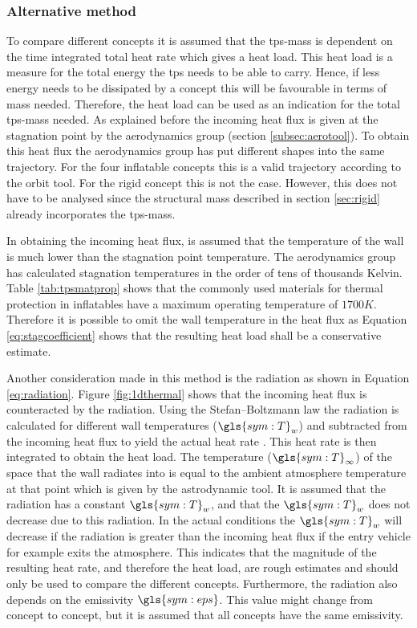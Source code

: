 \subsubsection{Alternative method}
To compare different concepts it is assumed that the \gls{tps}-mass is dependent on the time integrated total heat rate which gives a heat load. This heat load is a measure for the total energy the \gls{tps} needs to be able to carry. Hence, if less energy needs to be dissipated by a concept this will be favourable in terms of mass needed. Therefore, the heat load can be used as an indication for the total \gls{tps}-mass needed. As explained before the incoming heat flux is given at the stagnation point by the aerodynamics group (section \ref{subsec:aerotool}). To obtain this heat flux the aerodynamics group has put different shapes into the same trajectory. For the four inflatable concepts this is a valid trajectory according to the orbit tool. For the rigid concept this is not the case. However, this does not have to be analysed since the structural mass described in section \ref{sec:rigid} already incorporates the \gls{tps}-mass.

In obtaining the incoming heat flux, is assumed that the temperature of the wall is much lower than the stagnation point temperature. The aerodynamics group has calculated stagnation temperatures in the order of tens of thousands Kelvin. Table \ref{tab:tpsmatprop} shows that the commonly used materials for thermal protection in inflatables have a maximum operating temperature of $1700K$. Therefore it is possible to omit the wall temperature in the heat flux as Equation \eqref{eq:stagcoefficient} shows that the resulting heat load shall be a conservative estimate. 

Another consideration made in this method is the radiation as shown in Equation \ref{eq:radiation}. Figure \ref{fig:1dthermal} shows that the incoming heat flux is counteracted by the radiation. Using the Stefan–Boltzmann law the radiation is calculated for different wall temperatures ($\gls{sym:T}_w$) and subtracted from the incoming heat flux to yield the actual heat rate \cite{Holman2002}. This heat rate is then integrated to obtain the heat load. The temperature ($\gls{sym:T}_\infty$) of the space that the wall radiates into is equal to the ambient atmosphere temperature at that point which is given by the astrodynamic tool. It is assumed that the radiation has a constant $\gls{sym:T}_w$, and that the $\gls{sym:T}_w$ does not decrease due to this radiation. In the actual conditions the $\gls{sym:T}_w$ will decrease if the radiation is greater than the incoming heat flux if the entry vehicle for example exits the atmosphere. This indicates that the magnitude of the resulting heat rate, and therefore the heat load, are rough estimates and should only be used to compare the different concepts. Furthermore, the radiation also depends on the emissivity $ \gls{sym:eps}$. This value might change from concept to concept, but it is assumed that all concepts have the same emissivity.

